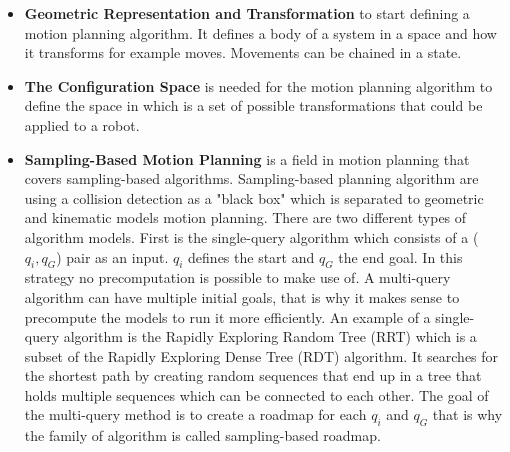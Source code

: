 \begin{itemize}
    \item \textbf{Geometric Representation and Transformation} to start defining a motion planning algorithm. It defines a body of a system in a space and how it transforms for example moves. Movements can be chained in a state.
    \item \textbf{The Configuration Space} is needed for the motion planning algorithm to define the space in which is a set of possible transformations that could be applied to a robot.
    \item \textbf{Sampling-Based Motion Planning} is a field in motion planning that covers sampling-based algorithms. Sampling-based planning algorithm are using a collision detection as a "black box" which is separated to geometric and kinematic models motion planning. There are two different types of algorithm models. First is the single-query algorithm which consists of a ($q_i,q_G$) pair as an input. $q_i$ defines the start and $q_G$ the end goal. In this strategy no precomputation is possible to make use of. A multi-query algorithm can have multiple initial goals, that is why it makes sense to precompute the models to run it more efficiently. An example of a single-query algorithm is the Rapidly Exploring Random Tree (RRT) which is a subset of the Rapidly Exploring Dense Tree (RDT) algorithm. It searches for the shortest path by creating random sequences that end up in a tree that holds multiple sequences which can be connected to each other. The goal of the multi-query  method is to create a roadmap for each $q_i$ and $q_G$ that is why the family of algorithm is called sampling-based roadmap.

\end{itemize}
